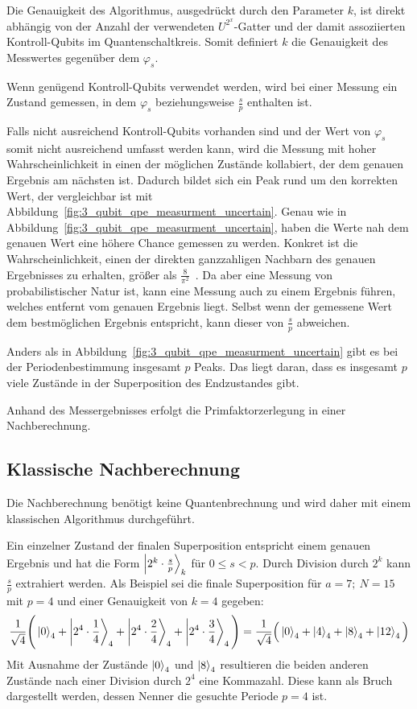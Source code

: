 Die Genauigkeit des Algorithmus, ausgedrückt durch den Parameter \(k\),
ist direkt abhängig von der Anzahl der verwendeten \(U^{2^x}\)-Gatter
und der damit assoziierten Kontroll-Qubits im Quantenschaltkreis.
Somit definiert \(k\) die Genauigkeit des Messwertes gegenüber dem \(\varphi_s\).

Wenn genügend Kontroll-Qubits verwendet werden, 
wird bei einer Messung ein Zustand gemessen, 
in dem \(\varphi_s\) beziehungsweise \(\frac{s}{p}\) enthalten ist.

Falls nicht ausreichend Kontroll-Qubits vorhanden sind 
und der Wert von \(\varphi_s\) somit nicht ausreichend umfasst werden kann,
wird die Messung mit hoher Wahrscheinlichkeit 
in einen der möglichen Zustände kollabiert, 
der dem genauen Ergebnis am nächsten ist.
Dadurch bildet sich ein Peak rund um den korrekten Wert, 
der vergleichbar ist mit Abbildung~\ref{fig:3_qubit_qpe_measurment_uncertain}.
Genau wie in Abbildung~\ref{fig:3_qubit_qpe_measurment_uncertain}, haben die Werte nah dem genauen Wert
eine höhere Chance gemessen zu werden. 
Konkret ist die Wahrscheinlichkeit, 
einen der direkten ganzzahligen Nachbarn des genauen Ergebnisses zu erhalten, 
größer als \(\frac{8}{\pi^2}\)~\cite[119]{kaye2007introduction}.
Da aber eine Messung von probabilistischer Natur ist, 
kann eine Messung auch zu einem Ergebnis führen, 
welches entfernt vom genauen Ergebnis liegt.
Selbst wenn der gemessene Wert dem bestmöglichen Ergebnis entspricht, 
kann dieser von \(\frac{s}{p}\) abweichen. 

Anders als in Abbildung~\ref{fig:3_qubit_qpe_measurment_uncertain} gibt es bei der Periodenbestimmung insgesamt \(p\) Peaks.
Das liegt daran, dass es insgesamt \(p\) viele Zustände in der Superposition des Endzustandes gibt.

Anhand des Messergebnisses erfolgt die Primfaktorzerlegung in einer Nachberechnung.

\subsection{Klassische Nachberechnung} \label{Funktionsweise:klassisch}
Die Nachberechnung benötigt keine Quantenbrechnung und 
wird daher mit einem klassischen Algorithmus durchgeführt.

Ein einzelner Zustand der finalen Superposition 
entspricht einem genauen Ergebnis und hat die Form \(\ket{2^k \cdot \frac{s}{p}}_k\) für \(0 \leq s < p\).
Durch Division durch \(2^k\) kann \(\frac{s}{p}\) extrahiert werden.
Als Beispiel sei die finale Superposition für \(a = 7;~N=15\) mit \(p=4\) und einer Genauigkeit von \(k=4\) gegeben:
\[\frac{1}{\sqrt{4}}
\Bigg(\ket{0}_4 +\ket{2^4 \cdot \frac{1}{4}}_4 + \ket{2^4 \cdot \frac{2}{4}}_4+\ket{2^4 \cdot \frac{3}{4}}_4
\Bigg) =
 \frac{1}{\sqrt{4}}
 \Big(\ket{0}_4 +\ket{4}_4 + \ket{8}_4+\ket{12}_4\Big) \]
Mit Ausnahme der Zustände \(\ket{0}_4\) und \(\ket{8}_4\) 
resultieren die beiden anderen Zustände nach einer Division durch \(2^4\) eine Kommazahl. 
Diese kann als Bruch dargestellt werden, 
dessen Nenner die gesuchte Periode \(p=4\) ist.

